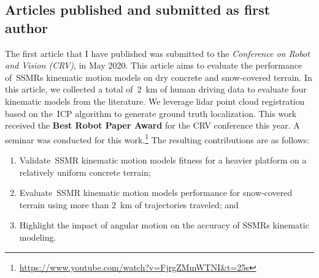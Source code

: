 \documentclass[12pt,letterpaper,oneside]{article}
\begin{document}

\subsection{Articles published and submitted as first author}
\label{sec:first_author}
\begin{center}
	\textbf{}
\end{center}

The first article that I have published was submitted to the \emph{Conference on Robot and Vision (CRV)}, in May 2020.
This article aims to evaluate the performance of~\acp{SSMR} kinematic motion models on dry concrete and snow-covered terrain.
In this article, we collected a total of~\SI{2}{\kilo\meter} of human driving data to evaluate four kinematic models from the literature.
We leverage lidar point cloud registration based on the~\ac{ICP} algorithm to generate ground truth localization.
This work received the \textbf{Best Robot Paper Award} for the CRV conference this year.
A seminar was conducted for this work.\footnote{\url{https://www.youtube.com/watch?v=FjrgZMmWTNI&t=25s}}
The resulting contributions are as follows:
\begin{enumerate}
	\item Validate~\ac{SSMR} kinematic motion models fitness for a heavier platform on a relatively uniform concrete terrain;
	\item Evaluate~\ac{SSMR} kinematic motion models performance for snow-covered terrain using more than \SI{2}{\kilo\meter} of trajectories traveled; and
	\item Highlight the impact of angular motion on the accuracy of \acp{SSMR} kinematic modeling.
\end{enumerate}
\end{document}
